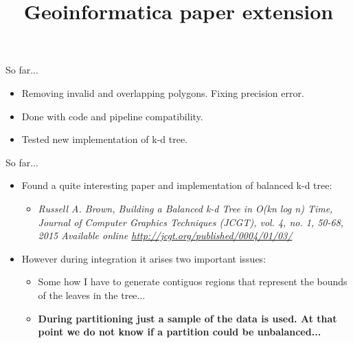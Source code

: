 \documentclass{beamer}
\makeatletter
\newcommand\makebeamertitle{\frame{\maketitle}}%
\let\origtableofcontents=\tableofcontents
\def\tableofcontents{\@ifnextchar[{\origtableofcontents}{\gobbletableofcontents}}
\def\gobbletableofcontents#1{\origtableofcontents}
\makeatother
\begin{document}
\title[SDCEL report]{Geoinformatica paper extension}
\author[AC]{}
\makebeamertitle
\newif\iflattersubsect


\AtBeginSubsection[] {
  \begin{frame}<beamer>
    \frametitle{Outline} 
    \tableofcontents[currentsubsection]  
  \end{frame}
}

\begin{frame}{So far...}
  \begin{itemize}
    \item Removing invalid and overlapping polygons.  Fixing precision error.
    \item Done with code and pipeline compatibility.
    \item Tested new implementation of k-d tree.
  \end{itemize}
\end{frame}

\begin{frame}{So far...}
  \begin{itemize}
    \item Found a quite interesting paper and implementation of balanced k-d tree:
    \begin{itemize}
      \item \textit{Russell A. Brown, Building a Balanced k-d Tree in O(kn log n) Time, Journal of Computer Graphics Techniques (JCGT), vol. 4, no. 1, 50-68,   
2015 
Available online \url{http://jcgt.org/published/0004/01/03/}}
    \end{itemize}

    \item However during integration it arises two important issues:
    \begin{itemize}
      \item Some how I have to generate contiguos regions that represent the bounds of the leaves in the tree...
      \item \textbf{During partitioning just a sample of the data is used.  At that point we do not know if a partition could be unbalanced...}
    \end{itemize}

  \end{itemize}
\end{frame}
\end{document}
